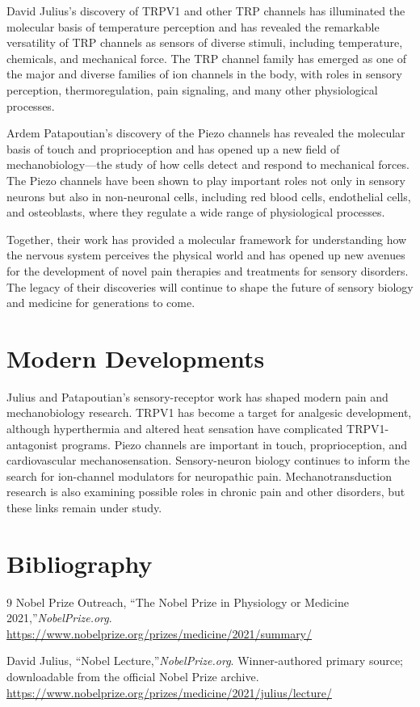 David Julius's discovery of TRPV1 and other TRP channels has illuminated the molecular basis of temperature perception and has revealed the remarkable versatility of TRP channels as sensors of diverse stimuli, including temperature, chemicals, and mechanical force. The TRP channel family has emerged as one of the major and diverse families of ion channels in the body, with roles in sensory perception, thermoregulation, pain signaling, and many other physiological processes.

Ardem Patapoutian's discovery of the Piezo channels has revealed the molecular basis of touch and proprioception and has opened up a new field of mechanobiology---the study of how cells detect and respond to mechanical forces. The Piezo channels have been shown to play important roles not only in sensory neurons but also in non-neuronal cells, including red blood cells, endothelial cells, and osteoblasts, where they regulate a wide range of physiological processes.

Together, their work has provided a molecular framework for understanding how the nervous system perceives the physical world and has opened up new avenues for the development of novel pain therapies and treatments for sensory disorders. The legacy of their discoveries will continue to shape the future of sensory biology and medicine for generations to come.


\section{Modern Developments}

Julius and Patapoutian's sensory-receptor work has shaped modern pain and mechanobiology research. TRPV1 has become a target for analgesic development, although hyperthermia and altered heat sensation have complicated TRPV1-antagonist programs. Piezo channels are important in touch, proprioception, and cardiovascular mechanosensation. Sensory-neuron biology continues to inform the search for ion-channel modulators for neuropathic pain. Mechanotransduction research is also examining possible roles in chronic pain and other disorders, but these links remain under study.


\section{Bibliography}

\begin{thebibliography}{9}
Nobel Prize Outreach, ``The Nobel Prize in Physiology or Medicine 2021,''\emph{NobelPrize.org}.\\
\url{https://www.nobelprize.org/prizes/medicine/2021/summary/}

David Julius, ``Nobel Lecture,''\emph{NobelPrize.org}. Winner-authored primary source; downloadable from the official Nobel Prize archive.\\
\url{https://www.nobelprize.org/prizes/medicine/2021/julius/lecture/}
\end{thebibliography}
